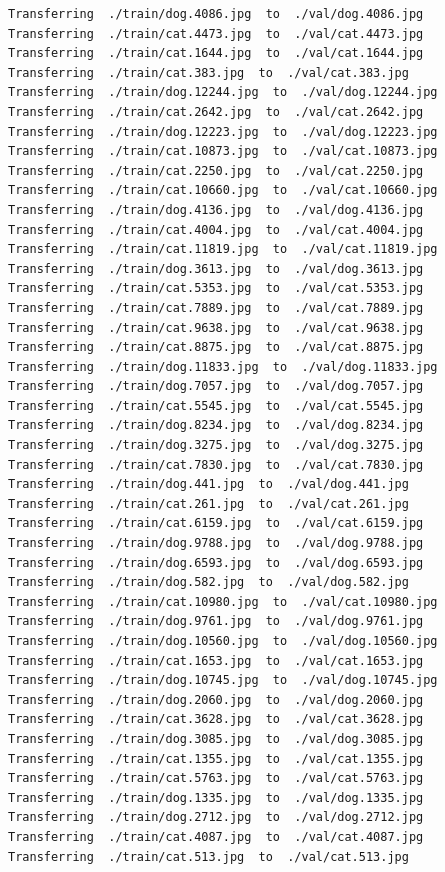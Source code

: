 \documentclass[]{book}
\theoremstyle{definition}
\theoremstyle{definition}
\theoremstyle{definition}
\theoremstyle{remark}
\begin{document}
\begin{verbatim}
Transferring  ./train/dog.4086.jpg  to  ./val/dog.4086.jpg
Transferring  ./train/cat.4473.jpg  to  ./val/cat.4473.jpg
Transferring  ./train/cat.1644.jpg  to  ./val/cat.1644.jpg
Transferring  ./train/cat.383.jpg  to  ./val/cat.383.jpg
Transferring  ./train/dog.12244.jpg  to  ./val/dog.12244.jpg
Transferring  ./train/cat.2642.jpg  to  ./val/cat.2642.jpg
Transferring  ./train/dog.12223.jpg  to  ./val/dog.12223.jpg
Transferring  ./train/cat.10873.jpg  to  ./val/cat.10873.jpg
Transferring  ./train/cat.2250.jpg  to  ./val/cat.2250.jpg
Transferring  ./train/cat.10660.jpg  to  ./val/cat.10660.jpg
Transferring  ./train/dog.4136.jpg  to  ./val/dog.4136.jpg
Transferring  ./train/cat.4004.jpg  to  ./val/cat.4004.jpg
Transferring  ./train/cat.11819.jpg  to  ./val/cat.11819.jpg
Transferring  ./train/dog.3613.jpg  to  ./val/dog.3613.jpg
Transferring  ./train/cat.5353.jpg  to  ./val/cat.5353.jpg
Transferring  ./train/cat.7889.jpg  to  ./val/cat.7889.jpg
Transferring  ./train/cat.9638.jpg  to  ./val/cat.9638.jpg
Transferring  ./train/cat.8875.jpg  to  ./val/cat.8875.jpg
Transferring  ./train/dog.11833.jpg  to  ./val/dog.11833.jpg
Transferring  ./train/dog.7057.jpg  to  ./val/dog.7057.jpg
Transferring  ./train/cat.5545.jpg  to  ./val/cat.5545.jpg
Transferring  ./train/dog.8234.jpg  to  ./val/dog.8234.jpg
Transferring  ./train/dog.3275.jpg  to  ./val/dog.3275.jpg
Transferring  ./train/cat.7830.jpg  to  ./val/cat.7830.jpg
Transferring  ./train/dog.441.jpg  to  ./val/dog.441.jpg
Transferring  ./train/cat.261.jpg  to  ./val/cat.261.jpg
Transferring  ./train/cat.6159.jpg  to  ./val/cat.6159.jpg
Transferring  ./train/dog.9788.jpg  to  ./val/dog.9788.jpg
Transferring  ./train/dog.6593.jpg  to  ./val/dog.6593.jpg
Transferring  ./train/dog.582.jpg  to  ./val/dog.582.jpg
Transferring  ./train/cat.10980.jpg  to  ./val/cat.10980.jpg
Transferring  ./train/dog.9761.jpg  to  ./val/dog.9761.jpg
Transferring  ./train/dog.10560.jpg  to  ./val/dog.10560.jpg
Transferring  ./train/cat.1653.jpg  to  ./val/cat.1653.jpg
Transferring  ./train/dog.10745.jpg  to  ./val/dog.10745.jpg
Transferring  ./train/dog.2060.jpg  to  ./val/dog.2060.jpg
Transferring  ./train/cat.3628.jpg  to  ./val/cat.3628.jpg
Transferring  ./train/dog.3085.jpg  to  ./val/dog.3085.jpg
Transferring  ./train/cat.1355.jpg  to  ./val/cat.1355.jpg
Transferring  ./train/cat.5763.jpg  to  ./val/cat.5763.jpg
Transferring  ./train/dog.1335.jpg  to  ./val/dog.1335.jpg
Transferring  ./train/dog.2712.jpg  to  ./val/dog.2712.jpg
Transferring  ./train/cat.4087.jpg  to  ./val/cat.4087.jpg
Transferring  ./train/cat.513.jpg  to  ./val/cat.513.jpg

\end{verbatim}
\end{document}

